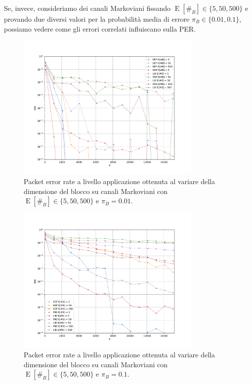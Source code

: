 \documentclass[italian, a4paper, 12pt]{article}
\newcommand{\E}[1]{\operatorname{E}\left[#1\right]}
\newcommand{\EnB}{\E{\#_B}}
\begin{document}
Se, invece, consideriamo dei canali Markoviani fissando $\EnB \in
\{5,50,500\}$ e provando due diversi valori per la probabilità media
di errore $\pi_B \in \{0.01, 0.1\}$, possiamo vedere come gli errori
correlati influiscano sulla PER.
%
\begin{figure}[htb]
  \centering
  \includegraphics[width=0.8\textwidth]{plot_markov_pi100}
  \caption{Packet error rate a livello applicazione ottenuta al
    variare della dimensione del blocco su canali Markoviani con $\EnB
    \in \{5,50,500\}$ e $\pi_B = 0.01$.}
  \label{fig:markov_pi100}
\end{figure}
%
\begin{figure}[htb]
  \centering
  \includegraphics[width=0.8\textwidth]{plot_markov_pi10}
  \caption{Packet error rate a livello applicazione ottenuta al
    variare della dimensione del blocco su canali Markoviani con $\EnB
    \in \{5,50,500\}$ e $\pi_B = 0.1$.}
  \label{fig:markov_pi10}
\end{figure}
\end{document}
